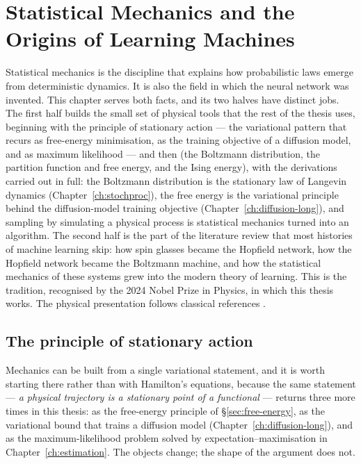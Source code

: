 \chapter{Statistical Mechanics and the Origins of Learning Machines}
\label{ch:statmech}\label{ch:background}

Statistical mechanics is the discipline that explains how probabilistic
laws emerge from deterministic dynamics. It is also the field in which the
neural network was invented. This chapter serves both facts, and its two
halves have distinct jobs. The first half builds the small set of physical
tools that the rest of the thesis uses, beginning with the principle of
stationary action --- the variational pattern that recurs as free-energy
minimisation, as the training objective of a diffusion model, and as
maximum likelihood --- and then (the Boltzmann distribution, the
partition function and free energy, and the Ising energy), with the
derivations carried out in full: the Boltzmann distribution is the
stationary law of Langevin dynamics (Chapter~\ref{ch:stochproc}), the free
energy is the variational principle behind the diffusion-model training
objective (Chapter~\ref{ch:diffusion-long}), and sampling by simulating a
physical process is statistical mechanics turned into an algorithm. The
second half is the part of the literature review that most histories of
machine learning skip: how spin glasses became the Hopfield network, how
the Hopfield network became the Boltzmann machine, and how the statistical
mechanics of these systems grew into the modern theory of learning. This
is the tradition, recognised by the 2024 Nobel Prize in Physics, in which
this thesis works. The physical presentation follows classical references
\citep{goldstein2002classical, landau1980statistical}.

\section{The principle of stationary action}\label{sec:action}

Mechanics can be built from a single variational statement, and it is worth
starting there rather than with Hamilton's equations, because the same
statement --- \emph{a physical trajectory is a stationary point of a
functional} --- returns three more times in this thesis: as the free-energy
principle of \S\ref{sec:free-energy}, as the variational bound that trains a
diffusion model (Chapter~\ref{ch:diffusion-long}), and as the maximum-likelihood
problem solved by expectation--maximisation in
Chapter~\ref{ch:estimation}. The objects change; the shape of the argument
does not.

